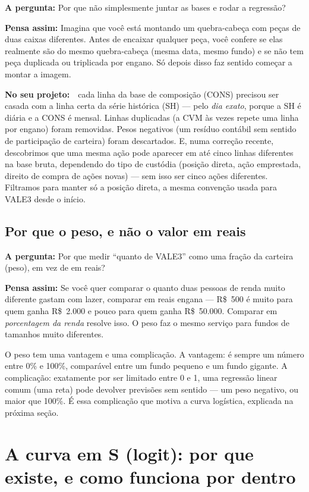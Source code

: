 \documentclass[11pt,a4paper]{article}
\newcommand{\pergunta}[1]{\par\vspace{4pt}\noindent\textbf{\color{azul}A pergunta:} #1\par\vspace{2pt}}
\newcommand{\analogia}[1]{\par\vspace{4pt}\noindent\textbf{\color{verde}Pensa assim:} #1\par\vspace{2pt}}
\newcommand{\noprojeto}[0]{\par\vspace{4pt}\noindent\textbf{No seu projeto:}\ }
\begin{document}
\pergunta{Por que não simplesmente juntar as bases e rodar a regressão?}

\analogia{Imagina que você está montando um quebra-cabeça com peças de duas caixas diferentes.
Antes de encaixar qualquer peça, você confere se elas realmente são do mesmo quebra-cabeça
(mesma data, mesmo fundo) e se não tem peça duplicada ou triplicada por engano. Só depois disso
faz sentido começar a montar a imagem.}

\noprojeto\ cada linha da base de composição (CONS) precisou ser casada com a linha certa da
série histórica (SH) --- pelo \emph{dia exato}, porque a SH é diária e a CONS é mensal. Linhas
duplicadas (a CVM às vezes repete uma linha por engano) foram removidas. Pesos negativos (um
resíduo contábil sem sentido de participação de carteira) foram descartados. E, numa correção
recente, descobrimos que uma mesma ação pode aparecer em até cinco linhas diferentes na base
bruta, dependendo do tipo de custódia (posição direta, ação emprestada, direito de compra de
ações novas) --- sem isso ser cinco ações diferentes. Filtramos para manter só a posição direta,
a mesma convenção usada para VALE3 desde o início.

\subsection{Por que o peso, e não o valor em reais}

\pergunta{Por que medir ``quanto de VALE3'' como uma fração da carteira (peso), em vez de em
reais?}

\analogia{Se você quer comparar o quanto duas pessoas de renda muito diferente gastam com
lazer, comparar em reais engana --- R\$~500 é muito para quem ganha R\$~2.000 e pouco para quem
ganha R\$~50.000. Comparar em \emph{porcentagem da renda} resolve isso. O peso faz o mesmo
serviço para fundos de tamanhos muito diferentes.}

O peso tem uma vantagem e uma complicação. A vantagem: é sempre um número entre 0\% e 100\%,
comparável entre um fundo pequeno e um fundo gigante. A complicação: exatamente por ser limitado
entre 0 e 1, uma regressão linear comum (uma reta) pode devolver previsões sem sentido --- um
peso negativo, ou maior que 100\%. É essa complicação que motiva a curva logística, explicada na
próxima seção.

\section{A curva em S (logit): por que existe, e como funciona por dentro}
\label{sec:curva}
\end{document}
